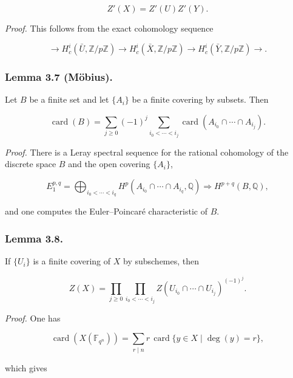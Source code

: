 \begin{equation}\tag{3.6.1}
Z'(X)=Z'(U)Z'(Y).
\end{equation}

\medskip
\noindent\emph{Proof.}
This follows from the exact cohomology sequence

\begin{equation}\tag{3.6.2}
\longrightarrow H_c^i(\bar U,\mathbb Z/p\mathbb Z)
\longrightarrow H_c^i(\bar X,\mathbb Z/p\mathbb Z)
\longrightarrow H_c^i(\bar Y,\mathbb Z/p\mathbb Z)\longrightarrow.
\end{equation}

\subsubsection*{Lemma 3.7 (M\"obius).}
Let $B$ be a finite set and let $\{A_i\}$ be a finite covering by subsets.
Then

\begin{equation}\tag{3.7.1}
\operatorname{card}(B)=
\sum_{j\geq0}(-1)^j
\sum_{i_0<\cdots<i_j}
\operatorname{card}(A_{i_0}\cap\cdots\cap A_{i_j}).
\end{equation}

\medskip
\noindent\emph{Proof.}
There is a Leray spectral sequence for the rational cohomology of the discrete
space $B$ and the open covering $\{A_i\}$,

\[
E_1^{p,q}=\bigoplus_{i_0<\cdots<i_q}
H^p(A_{i_0}\cap\cdots\cap A_{i_q},\mathbb Q)
\Longrightarrow H^{p+q}(B,\mathbb Q),
\]

and one computes the Euler--Poincar\'e characteristic of $B$.

\subsubsection*{Lemma 3.8.}
If $\{U_i\}$ is a finite covering of $X$ by subschemes, then

\begin{equation}\tag{3.8.1}
Z(X)=
\prod_{j\geq0}
\prod_{i_0<\cdots<i_j}
Z(U_{i_0}\cap\cdots\cap U_{i_j})^{(-1)^j}.
\end{equation}

\medskip
\noindent\emph{Proof.}
One has

\begin{equation}\tag{3.8.2}
\operatorname{card}(X(\mathbb F_{q^n}))
=\sum_{r\mid n}r\,\operatorname{card}\{y\in X\mid\deg(y)=r\},
\end{equation}

which gives

